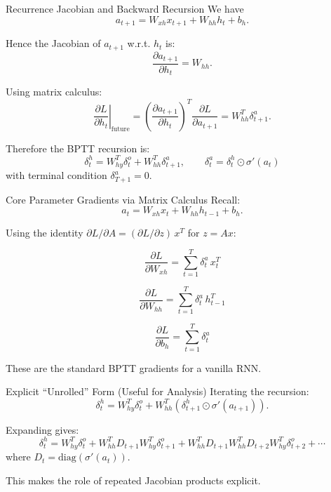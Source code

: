 \documentclass{beamer}
\begin{document}
\begin{frame}{Recurrence Jacobian and Backward Recursion}
  We have
  \[
  a_{t+1} = W_{xh}x_{t+1}+W_{hh}h_t+b_h.
  \]

  Hence the Jacobian of \(a_{t+1}\) w.r.t. \(h_t\) is:
  \[
  \frac{\partial a_{t+1}}{\partial h_t} = W_{hh}.
  \]

  Using matrix calculus:
  \[
  \left.\frac{\partial L}{\partial h_t}\right|_{\text{future}}
  =
  \left(\frac{\partial a_{t+1}}{\partial h_t}\right)^T
  \frac{\partial L}{\partial a_{t+1}}
  =
  W_{hh}^T \delta^a_{t+1}.
  \]

  Therefore the BPTT recursion is:
  \[
  \boxed{\delta^h_t = W_{hy}^T\delta^o_t + W_{hh}^T\delta^a_{t+1}},
  \qquad
  \boxed{\delta^a_t = \delta^h_t \odot \sigma'(a_t)}
  \]
  with terminal condition \(\delta^a_{T+1}=0\).
\end{frame}

\begin{frame}{Core Parameter Gradients via Matrix Calculus}
  Recall:
  \[
  a_t = W_{xh}x_t + W_{hh}h_{t-1} + b_h.
  \]

  Using the identity \(\partial L/\partial A = (\partial L/\partial z)\,x^T\) for \(z=Ax\):

  \[
  \boxed{
    \frac{\partial L}{\partial W_{xh}} = \sum_{t=1}^T \delta^a_t\, x_t^T}
  \]

  \[
  \boxed{
    \frac{\partial L}{\partial W_{hh}} = \sum_{t=1}^T \delta^a_t\, h_{t-1}^T}
  \]

  \[
  \boxed{
    \frac{\partial L}{\partial b_h} = \sum_{t=1}^T \delta^a_t}
  \]

  These are the standard BPTT gradients for a vanilla RNN.
\end{frame}

\begin{frame}{Explicit ``Unrolled'' Form (Useful for Analysis)}
  Iterating the recursion:
  \[
  \delta^h_t = W_{hy}^T\delta^o_t + W_{hh}^T(\delta^h_{t+1}\odot\sigma'(a_{t+1})).
  \]

  Expanding gives:
  \[
  \delta^h_t
  =
  W_{hy}^T\delta^o_t
  +
  W_{hh}^T D_{t+1} W_{hy}^T\delta^o_{t+1}
  +
  W_{hh}^T D_{t+1} W_{hh}^T D_{t+2} W_{hy}^T\delta^o_{t+2}
  +\cdots
  \]
  where \(D_t=\mathrm{diag}(\sigma'(a_t))\).

  This makes the role of repeated Jacobian products explicit.
\end{frame}
\end{document}
